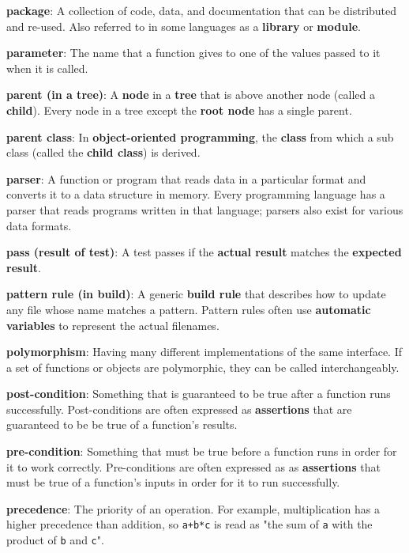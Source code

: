 \documentclass{scrbook}
\newcommand{\glosskey}[1]{\textbf{#1}}
\begin{document}
\noindent \textbf{\glosskey{package}}: 
A collection of code, data, and documentation that can be distributed and re-used. Also referred to in some languages as a \glosskey{library} or \glosskey{module}.


\noindent \textbf{\glosskey{parameter}}: 
The name that a function gives to one of the values passed to it when it is called.


\noindent \textbf{\glosskey{parent (in a tree)}}: 
A \glosskey{node} in a \glosskey{tree} that is above another node (called a \glosskey{child}). Every node in a tree except the \glosskey{root node} has a single parent.


\noindent \textbf{\glosskey{parent class}}: 
In \glosskey{object-oriented programming}, the \glosskey{class} from which a sub class (called the \glosskey{child class}) is derived.


\noindent \textbf{\glosskey{parser}}: 
A function or program that reads data in a particular format and converts it to a data structure in memory. Every programming language has a parser that reads programs written in that language; parsers also exist for various data formats.


\noindent \textbf{\glosskey{pass (result of test)}}: 
A test passes if the \glosskey{actual result} matches the \glosskey{expected result}.


\noindent \textbf{\glosskey{pattern rule (in build)}}: 
A generic \glosskey{build rule} that describes how to update any file whose name matches a pattern. Pattern rules often use \glosskey{automatic variables} to represent the actual filenames.


\noindent \textbf{\glosskey{polymorphism}}: 
Having many different implementations of the same interface. If a set of functions or objects are polymorphic, they can be called interchangeably.


\noindent \textbf{\glosskey{post-condition}}: 
Something that is guaranteed to be true after a function runs successfully. Post-conditions are often expressed as \glosskey{assertions} that are guaranteed to be be true of a function's results.


\noindent \textbf{\glosskey{pre-condition}}: 
Something that must be true before a function runs in order for it to work correctly. Pre-conditions are often expressed as as \glosskey{assertions} that must be true of a function's inputs in order for it to run successfully.


\noindent \textbf{\glosskey{precedence}}: 
The priority of an operation. For example, multiplication has a higher precedence than addition, so \texttt{a+b*c} is read as "the sum of \texttt{a} with the product of \texttt{b} and \texttt{c}".
\end{document}
